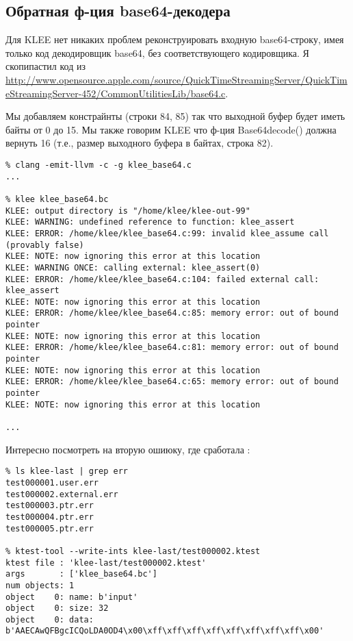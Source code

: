 \subsection{Обратная ф-ция base64-декодера}

Для KLEE нет никаких проблем реконструировать входную base64-строку, имея только код декодировщик base64, без соответствующего
кодировщика.
Я скопипастил код из
\url{http://www.opensource.apple.com/source/QuickTimeStreamingServer/QuickTimeStreamingServer-452/CommonUtilitiesLib/base64.c}.

Мы добавляем констрайнты (строки 84, 85) так что выходной буфер будет иметь байты от 0 до 15.
Мы также говорим KLEE что ф-ция Base64decode() должна вернуть 16 (т.е., размер выходного буфера в байтах, строка 82).



\begin{lstlisting}
% clang -emit-llvm -c -g klee_base64.c
...

% klee klee_base64.bc
KLEE: output directory is "/home/klee/klee-out-99"
KLEE: WARNING: undefined reference to function: klee_assert
KLEE: ERROR: /home/klee/klee_base64.c:99: invalid klee_assume call (provably false)
KLEE: NOTE: now ignoring this error at this location
KLEE: WARNING ONCE: calling external: klee_assert(0)
KLEE: ERROR: /home/klee/klee_base64.c:104: failed external call: klee_assert
KLEE: NOTE: now ignoring this error at this location
KLEE: ERROR: /home/klee/klee_base64.c:85: memory error: out of bound pointer
KLEE: NOTE: now ignoring this error at this location
KLEE: ERROR: /home/klee/klee_base64.c:81: memory error: out of bound pointer
KLEE: NOTE: now ignoring this error at this location
KLEE: ERROR: /home/klee/klee_base64.c:65: memory error: out of bound pointer
KLEE: NOTE: now ignoring this error at this location

...
\end{lstlisting}

Интересно посмотреть на вторую ошиюку, где сработала :

\begin{lstlisting}
% ls klee-last | grep err
test000001.user.err
test000002.external.err
test000003.ptr.err
test000004.ptr.err
test000005.ptr.err

% ktest-tool --write-ints klee-last/test000002.ktest
ktest file : 'klee-last/test000002.ktest'
args       : ['klee_base64.bc']
num objects: 1
object    0: name: b'input'
object    0: size: 32
object    0: data: b'AAECAwQFBgcICQoLDA0OD4\x00\xff\xff\xff\xff\xff\xff\xff\xff\x00'
\end{lstlisting}

